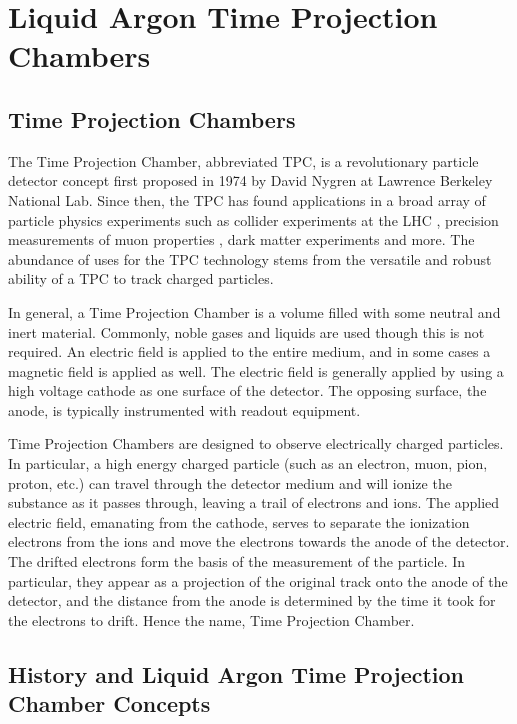 \chapter{\label{chp:lartpcs} Liquid Argon Time Projection Chambers}

\section{Time Projection Chambers}

The Time Projection Chamber, abbreviated TPC, is a revolutionary particle detector concept first proposed in 1974 by David Nygren at Lawrence Berkeley National Lab.  Since then, the TPC has found applications in a broad array of particle physics experiments such as collider experiments at the LHC \cite{Lippmann:2104844,Aamodt:2008zz}, precision measurements of muon properties \cite{Luo:2015oca}, dark matter experiments \cite{Akerib:2012ys,Aprile:2011dd} and more.  The abundance of uses for the TPC technology stems from the versatile and robust ability of a TPC to track charged particles.

In general, a Time Projection Chamber is a volume filled with some neutral and inert material.  Commonly, noble gases and liquids are used though this is not required.  An electric field is applied to the entire medium, and in some cases a magnetic field is applied as well.  The electric field is generally applied by using a high voltage cathode as one surface of the detector.  The opposing surface, the anode, is typically instrumented with readout equipment.

Time Projection Chambers are designed to observe electrically charged particles.  In particular, a high energy charged particle (such as an electron, muon, pion, proton, etc.) can travel through the detector medium and will ionize the substance as it passes through, leaving a trail of electrons and ions.  The applied electric field, emanating from the cathode, serves to separate the ionization electrons from the ions and move the electrons towards the anode of the detector.  The drifted electrons form the basis of the measurement of the particle.  In particular, they appear as a projection of the original track onto the anode of the detector, and the distance from the anode is determined by the time it took for the electrons to drift.  Hence the name, Time Projection Chamber.

\section{History and Liquid Argon Time Projection Chamber Concepts}

